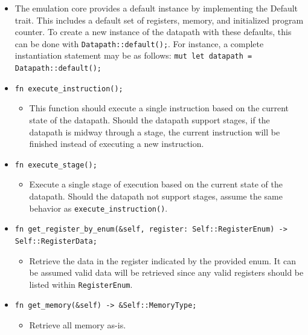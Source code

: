 \documentclass[
    parskip=half,
    fontsize=12pt,
    titlepage=firstiscover,
    toc=bibliography,
    numbers=endperiod
]{scrartcl}
\providecommand{\tightlist}{%
  \setlength{\itemsep}{0pt}\setlength{\parskip}{0pt}}
\begin{document}
\begin{itemize}
\begin{itemize}
        \item The emulation core provides a default instance by implementing the
            Default trait. This includes a default set of registers, memory, and
            initialized program counter. To create a new instance of the
            datapath with these defaults, this can be done with
            \texttt{Datapath::default();}. For instance, a complete instantiation
            statement may be as follows: \texttt{mut let datapath = Datapath::default();}
        \item \texttt{fn execute\_instruction();}
        \begin{itemize}
            \tightlist
            \item This function should execute a single instruction based on the
            current state of the datapath. Should the datapath support stages,
            if the datapath is midway through a stage, the current instruction
            will be finished instead of executing a new instruction.
        \end{itemize}
        \item \texttt{fn execute\_stage();}
        \begin{itemize}
            \tightlist
            \item Execute a single stage of execution based on the current state of
            the datapath. Should the datapath not support stages, assume the
            same behavior as \texttt{execute\_instruction()}.
        \end{itemize}
        \item \texttt{fn get\_register\_by\_enum(\&self, register: Self::RegisterEnum) -\textgreater{} Self::RegisterData;}
        \begin{itemize}
            \tightlist
            \item Retrieve the data in the register indicated by the provided enum.
            It can be assumed valid data will be retrieved since any valid
            registers should be listed within \texttt{RegisterEnum}.
        \end{itemize}
        \item \texttt{fn get\_memory(\&self) -\textgreater{} \&Self::MemoryType;}
        \begin{itemize}
            \tightlist
            \item Retrieve all memory as-is.
        \end{itemize}
    \end{itemize}


\end{itemize}
\end{document}
